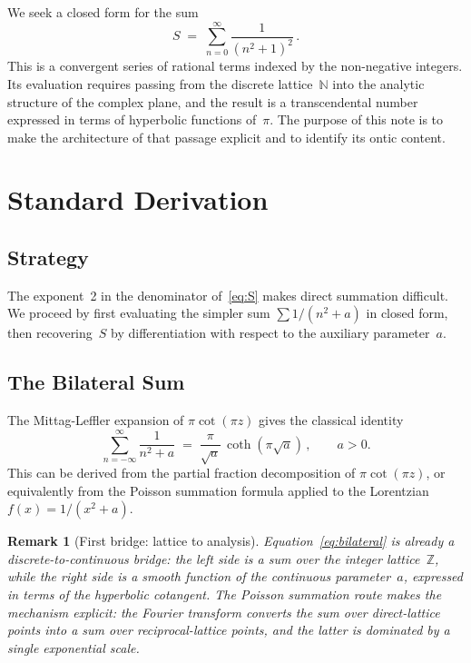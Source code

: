 \documentclass[12pt]{article}
\newtheorem{remark}[theorem]{Remark}
\newcommand{\Z}{\mathbb{Z}}
\newcommand{\N}{\mathbb{N}}
\begin{document}
We seek a closed form for the sum
\begin{equation}\label{eq:S}
S \;=\; \sum_{n=0}^{\infty}\frac{1}{(n^2+1)^2}\,.
\end{equation}
This is a convergent series of rational terms indexed by the non-negative
integers.  Its evaluation requires passing from the discrete lattice~$\N$
into the analytic structure of the complex plane, and the result is a
transcendental number expressed in terms of hyperbolic functions of~$\pi$.
The purpose of this note is to make the architecture of that passage
explicit and to identify its ontic content.

\section{Standard Derivation}

\subsection{Strategy}

The exponent~2 in the denominator of~\eqref{eq:S} makes direct summation
difficult.  We proceed by first evaluating the simpler sum
$\sum 1/(n^2+a)$ in closed form, then recovering~$S$ by differentiation
with respect to the auxiliary parameter~$a$.

\subsection{The Bilateral Sum}

The Mittag-Leffler expansion of $\pi\cot(\pi z)$ gives the classical identity
\begin{equation}\label{eq:bilateral}
\sum_{n=-\infty}^{\infty}\frac{1}{n^2+a}
\;=\;\frac{\pi}{\sqrt{a}}\,\coth(\pi\sqrt{a})\,,
\qquad a>0.
\end{equation}
This can be derived from the partial fraction decomposition of
$\pi\cot(\pi z)$, or equivalently from the Poisson summation formula
applied to the Lorentzian $f(x)=1/(x^2+a)$.

\begin{remark}[First bridge: lattice to analysis]\label{rem:bridge1}
Equation~\eqref{eq:bilateral} is already a discrete-to-continuous bridge:
the left side is a sum over the integer lattice~$\Z$, while the right side
is a smooth function of the continuous parameter~$a$, expressed in terms of
the hyperbolic cotangent.  The Poisson summation route makes the mechanism
explicit: the Fourier transform converts the sum over direct-lattice points
into a sum over reciprocal-lattice points, and the latter is dominated by a
single exponential scale.
\end{remark}
\end{document}
